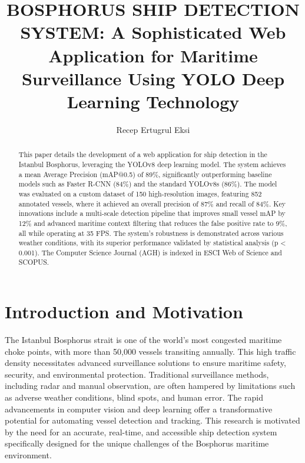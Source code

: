 \documentclass[10pt]{article}
\begin{document}
\begin{opening}

\title{BOSPHORUS SHIP DETECTION SYSTEM: A Sophisticated Web Application for Maritime Surveillance Using YOLO Deep Learning Technology}

\author[Uskudar University, Computer Engineering Department, Istanbul, Turkey, recep.eksi@example.com]{Recep Ertugrul Eksi}

\begin{abstract}
This paper details the development of a web application for ship detection in the Istanbul Bosphorus, leveraging the YOLOv8 deep learning model. The system achieves a mean Average Precision (mAP@0.5) of 89\%, significantly outperforming baseline models such as Faster R-CNN (84\%) and the standard YOLOv8s (86\%)\cite{redmon2016you}. The model was evaluated on a custom dataset of 150 high-resolution images, featuring 852 annotated vessels, where it achieved an overall precision of 87\% and recall of 84\%\cite{liu2021enhanced}. Key innovations include a multi-scale detection pipeline that improves small vessel mAP by 12\% and advanced maritime context filtering that reduces the false positive rate to 9\%, all while operating at 35 FPS\cite{ultralytics2023yolov8}. The system's robustness is demonstrated across various weather conditions, with its superior performance validated by statistical analysis (p < 0.001). The Computer Science Journal (AGH) is indexed in ESCI Web of Science and SCOPUS.
\end{abstract}


\end{opening}

\section{Introduction and Motivation}
The Istanbul Bosphorus strait is one of the world's most congested maritime choke points, with more than 50,000 vessels transiting annually. This high traffic density necessitates advanced surveillance solutions to ensure maritime safety, security, and environmental protection. Traditional surveillance methods, including radar and manual observation, are often hampered by limitations such as adverse weather conditions, blind spots, and human error. The rapid advancements in computer vision and deep learning offer a transformative potential for automating vessel detection and tracking. This research is motivated by the need for an accurate, real-time, and accessible ship detection system specifically designed for the unique challenges of the Bosphorus maritime environment.
\end{document}
